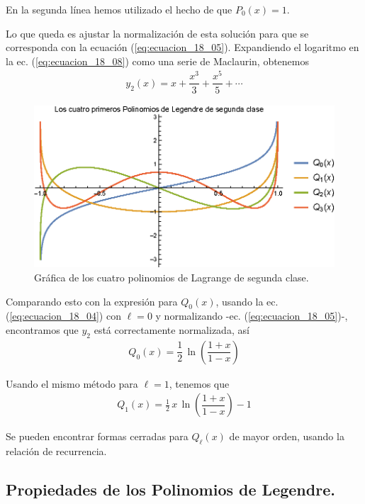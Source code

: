 En la segunda línea hemos utilizado el hecho de que $P_{0}(x)=1$.
\par
Lo que queda es ajustar la normalización de esta solución para que se corresponda con la ecuación (\ref{eq:ecuacion_18_05}). Expandiendo el logaritmo en la ec. (\ref{eq:ecuacion_18_08}) como una serie de Maclaurin, obtenemos
\begin{align*}
y_{2}(x) = x + \dfrac{x^{3}}{3} + \dfrac{x^{5}}{5} + \cdots \end{align*}

\begin{figure}[H]
    \centering
    \includegraphics[scale=1.3]{Imagenes/Plot_LagrangeSC_0-4.eps}
    \caption{Gráfica de los cuatro polinomios de Lagrange de segunda clase.}
    \label{fig:polinomios_Lagrange_02}
\end{figure}

Comparando esto con la expresión para $Q_{0}(x)$, usando la ec. (\ref{eq:ecuacion_18_04}) con $\ell = 0$ y normalizando -ec. (\ref{eq:ecuacion_18_05})-, encontramos que $y_{2}$ está correctamente normalizada, así
\begin{align*}
Q_{0} (x) = \dfrac{1}{2} \, \ln \left( \dfrac{1 + x}{1 - x} \right)
\end{align*}

Usando el mismo método para $\ell = 1$, tenemos que
\begin{align*}
Q_{1} (x) =  \frac{1}{2} \, x \,  \ln \left( \dfrac{1 + x}{1 - x} \right) - 1
\end{align*}

Se pueden encontrar formas cerradas para $Q_{\ell}(x)$ de mayor orden, usando la relación de recurrencia.

\subsection{Propiedades de los Polinomios de Legendre.}

